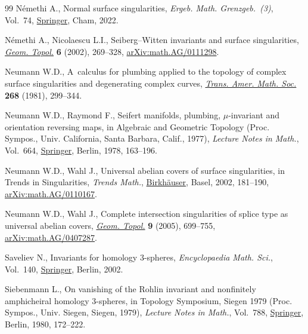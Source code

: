 \documentclass[10pt,a4paper]{amsart}
\providecommand{\LastPageEnding}{}
\begin{document}
\begin{thebibliography}{99}
N\'emethi A., Normal surface singularities, \textit{Ergeb. Math.
 Grenzgeb.~(3)}, Vol.~74,
 \href{https://doi.org/10.1007/978-3-031-06753-2}{Springer}, Cham, 2022.

N\'emethi A., Nicolaescu L.I., Seiberg--{W}itten invariants and surface
 singularities, \href{https://doi.org/10.2140/gt.2002.6.269}{\textit{Geom.
 Topol.}} \textbf{6} (2002), 269--328,
 \href{http://arxiv.org/abs/math.AG/0111298}{arXiv:math.AG/0111298}.

Neumann W.D., A~calculus for plumbing applied to the topology of complex
 surface singularities and degenerating complex curves,
 \href{https://doi.org/10.2307/1999331}{\textit{Trans. Amer. Math. Soc.}}
 \textbf{268} (1981), 299--344.

Neumann W.D., Raymond F., Seifert manifolds, plumbing, {$\mu $}-invariant and
 orientation reversing maps, in Algebraic and Geometric Topology ({P}roc.
 {S}ympos., {U}niv. {C}alifornia, {S}anta {B}arbara, {C}alif., 1977),
 \textit{Lecture Notes in Math.}, Vol.~664,
 \href{https://doi.org/10.1007/BFb0061699}{Springer}, Berlin, 1978, 163--196.

Neumann W.D., Wahl J., Universal abelian covers of surface singularities, in
 Trends in Singularities, \textit{Trends Math.},
 \href{https://doi.org/10.1007/978-3-0348-8161-6_8}{Birkh\"auser}, Basel,
 2002, 181--190,
 \href{http://arxiv.org/abs/math.AG/0110167}{arXiv:math.AG/0110167}.

Neumann W.D., Wahl J., Complete intersection singularities of splice type as
 universal abelian covers,
 \href{https://doi.org/10.2140/gt.2005.9.699}{\textit{Geom. Topol.}}
 \textbf{9} (2005), 699--755,
 \href{http://arxiv.org/abs/math.AG/0407287}{arXiv:math.AG/0407287}.

Saveliev N., Invariants for homology {$3$}-spheres, \textit{Encyclopaedia Math. Sci.}, Vol.~140,
 \href{https://doi.org/10.1007/978-3-662-04705-7}{Springer}, Berlin, 2002.

Siebenmann L., On vanishing of the {R}ohlin invariant and nonfinitely
 amphicheiral homology {$3$}-spheres, in Topology {S}ymposium, {S}iegen 1979
 ({P}roc. {S}ympos., {U}niv. {S}iegen, {S}iegen, 1979), \textit{Lecture Notes
 in Math.}, Vol.~788, \href{https://doi.org/10.1007/BFb0099246}{Springer},
 Berlin, 1980, 172--222.

\end{thebibliography}\LastPageEnding
\end{document}

